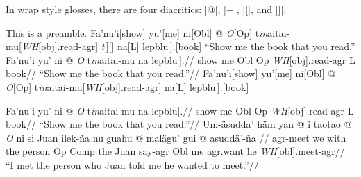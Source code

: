 
In wrap style glosses, there are four diacritics: |@|, |+|, |[|, and
|]|.


\pex
\a
\begingl[glstyle=nlevel]
\glpreamble
This is a preamble.
\endpreamble
Fa'nu'i[show]
yu'[me]
ni[Obl]
\nogloss{$[[\,$}@
{\it O}[Op]
t{\it in\/}aitai-mu[{{\it WH\/}[obj].read-agr}]
{\it t$\,]$}[]
na[L]
lepblu$\,].$[book]
\glft ``Show me the book that you read.''
\endgl
\a
\begingl[glstyle=wrap,everygla=,glhangstyle=normal]
\gla Fa'nu'i yu' ni \nogloss{$[[\,$} @ {\it O} t{\it in\/}aitai-mu
\nogloss{{\it t\/}$\,]$} na {lepblu$\,]$.}//
\glb show me Obl Op {\it WH\/}[obj].read-agr L book//
\glft ``Show me the book that you read.''//
\endgl
\a
\begingl[glstyle=nlevel]
Fa'nu'i[show]
yu'[me]
ni[Obl]
\nogloss{$[[\,$}@
{\it O}[Op]
t{\it in\/}aitai-mu[{{\it WH\/}[obj].read-agr}]
\nogloss{\it t$\,]$}
na[L]
lepblu$\,].$[book]
\endgl
\xe

\a
\begingl[glstyle=wrap,everygla=,glhangstyle=normal]
\gla Fa'nu'i yu' ni \nogloss{[[} @ {\it O} t{\it in\/}aitai-mu
\nogloss{{\it t\/}]} na {lepblu].}//
\glb show me Obl Op {\it WH\/}[obj].read-agr L book//
\glft ``Show me the book that you read.''//
\endgl
\a \begingl
\gla Um-\"asudda' h\"am yan \nogloss{[} @ i taotao \nogloss{[} @ {\it O\/} ni si Juan
ilek-\~na nu guahu \nogloss{[} @ mal\"agu' gui \nogloss{[} @ asudd\"a'-\~na
 \nogloss{]]]].}//
\glb agr-meet we with the person Op Comp the Juan say-agr Obl me
agr.want he {\it WH\/}[obl].meet-agr//
\glft ``I met the person who Juan told me he wanted to meet.''//
\endgl
\xe

